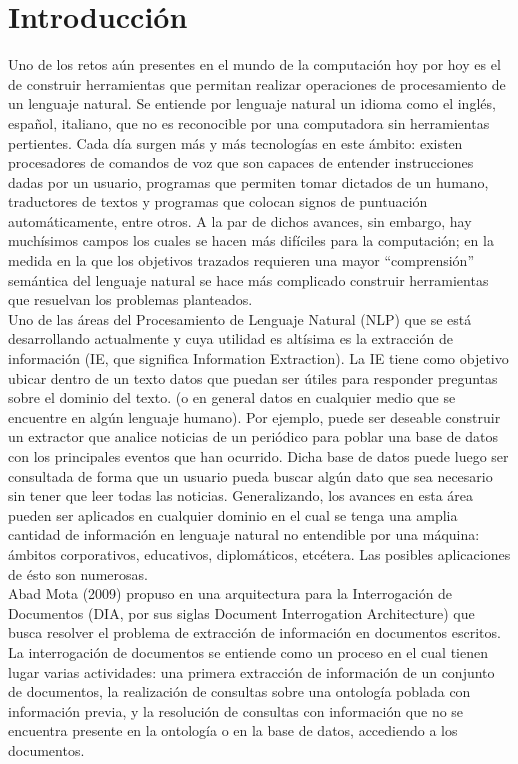 \chapter*{Introducción} \label{chap:intro}

Uno de los retos aún presentes en el mundo de la computación hoy por hoy es el de construir herramientas que permitan realizar operaciones de procesamiento de un lenguaje natural. Se entiende por lenguaje natural un idioma como el inglés, español, italiano, que no es reconocible por una computadora sin herramientas pertientes. Cada día surgen más y más tecnologías en este ámbito: existen procesadores de comandos de voz que son capaces de entender instrucciones dadas por un usuario, programas que permiten tomar dictados de un humano, traductores de textos y programas que colocan signos de puntuación automáticamente, entre otros. A la par de dichos avances, sin embargo, hay muchísimos campos los cuales se hacen más difíciles para la computación; en la medida en la que los objetivos trazados requieren una mayor ``comprensión'' semántica del lenguaje natural se hace más complicado construir herramientas que resuelvan los problemas planteados. \\ 

Uno de las áreas del Procesamiento de Lenguaje Natural (NLP) que se está desarrollando actualmente y cuya utilidad es altísima es la extracción de información (IE, que significa Information Extraction). La IE tiene como objetivo ubicar dentro de un texto datos que puedan ser útiles para responder preguntas sobre el dominio del texto. (o en general datos en cualquier medio que se encuentre en algún lenguaje humano). Por ejemplo, puede ser deseable construir un extractor que analice noticias de un periódico para poblar una base de datos con los principales eventos que han ocurrido. Dicha base de datos puede luego ser consultada de forma que un usuario pueda buscar algún dato que sea necesario sin tener que leer todas las noticias. Generalizando, los avances en esta  área pueden ser aplicados en cualquier dominio en el cual se tenga una amplia cantidad de información en lenguaje natural no entendible por una máquina: ámbitos corporativos, educativos, diplomáticos, etcétera. Las posibles aplicaciones de ésto son numerosas.\\

Abad Mota (2009) propuso en \cite{documentInterrogationArchitecture} una arquitectura para la Interrogación de Documentos (DIA, por sus siglas Document Interrogation Architecture) que busca resolver el problema de extracción de información en documentos escritos. La interrogación de documentos se entiende como un proceso en el cual tienen lugar varias actividades: una primera extracción de información de un conjunto de documentos, la realización de consultas sobre una ontología poblada con información previa, y la resolución de consultas con información que no se encuentra presente en la ontología o en la base de datos, accediendo a los documentos. \\

